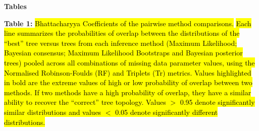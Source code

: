 \documentclass[12pt,letterpaper]{article}
\begin{document}
\newpage
\begin{landscape}


\noindent
\textbf{Tables}\\
\bigskip

\noindent
\textbf{Table 1:} \hl{Bhattacharyya Coefficients of the pairwise method comparisons.}
\hl{Each line summarizes the probabilities of overlap between the distributions of the ``best'' tree versus trees from each inference method (Maximum Likelihood; Bayesian consensus; Maximum Likelihood Bootstraps and Bayesian posterior trees) pooled across all combinations of missing data parameter values, using the Normalised Robinson-Foulds (RF) and Triplets (Tr) metrics. 
Values highlighted in bold are the extreme values of high or low probability of overlap between two methods. If two methods have a high probability of overlap, they have a similar ability to recover the ``correct'' tree topology.
Values $>$ 0.95 denote significantly similar distributions and values $<$ 0.05 denote significantly different distributions.}\\


\end{landscape}
\end{document}
